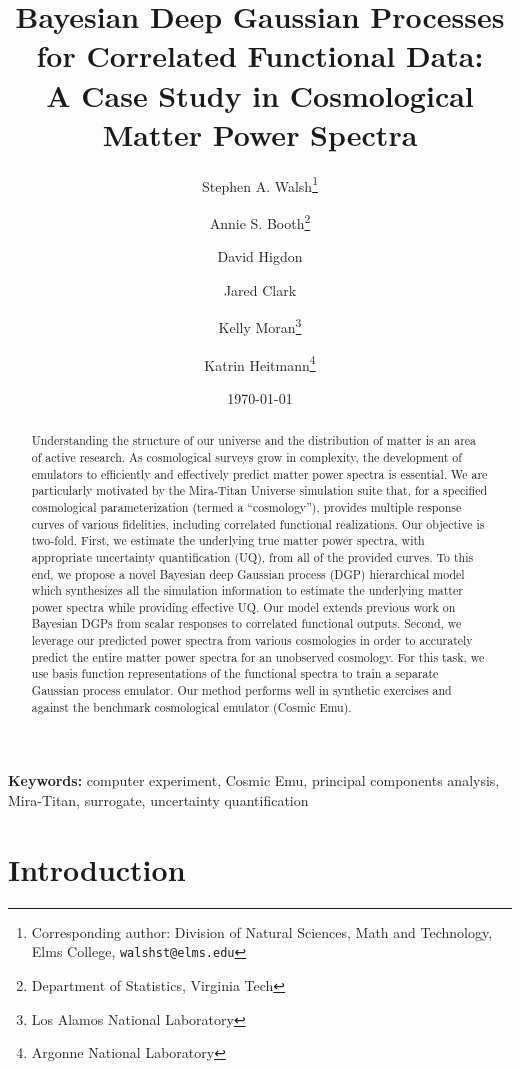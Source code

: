 \documentclass[11pt]{article}
\title{Bayesian Deep Gaussian Processes for Correlated Functional Data: \\
        A Case Study in Cosmological Matter Power Spectra}
\author{Stephen A. Walsh\thanks{Corresponding author: Division of Natural Sciences, 
        Math and Technology, Elms College, {\tt walshst@elms.edu}} \and 
        Annie S. Booth\thanks{Department of Statistics, Virginia Tech} \and
        David Higdon\footnotemark[2] \and
        Jared Clark\footnotemark[2] \and
        Kelly Moran\thanks{Los Alamos National Laboratory} \and
        Katrin Heitmann\thanks{Argonne National Laboratory}}
\date{\today}
\begin{document}
\maketitle
\bigskip

\begin{abstract} 
Understanding the structure of our universe and the distribution of matter is an 
area of active research.  As cosmological surveys grow in complexity, the development 
of emulators to efficiently and effectively predict matter power spectra is essential.  
We are particularly motivated by the Mira-Titan Universe simulation
suite that, for a specified cosmological parameterization (termed a ``cosmology''), 
provides multiple response curves of various fidelities, including correlated 
functional realizations.  Our objective is two-fold.  First, we estimate 
the underlying true matter power spectra, with appropriate uncertainty 
quantification (UQ), from all of the provided curves.  To this end, we propose a 
novel Bayesian deep Gaussian process (DGP) hierarchical model which synthesizes 
all the simulation information to estimate the underlying matter power spectra
while providing effective UQ.  Our model extends previous work on Bayesian DGPs 
from scalar responses to correlated functional outputs.  Second, we leverage our predicted 
power spectra from various cosmologies in order to accurately predict the entire 
matter power spectra for an 
unobserved cosmology.  For this task, we use basis function representations 
of the functional spectra to train a separate Gaussian process emulator.  
Our method performs well in synthetic exercises and against the benchmark cosmological 
emulator (Cosmic Emu).
\end{abstract}

\noindent \textbf{Keywords:} computer experiment, Cosmic Emu, 
principal components analysis, Mira-Titan, surrogate, uncertainty quantification


\section{Introduction}

\end{document}
